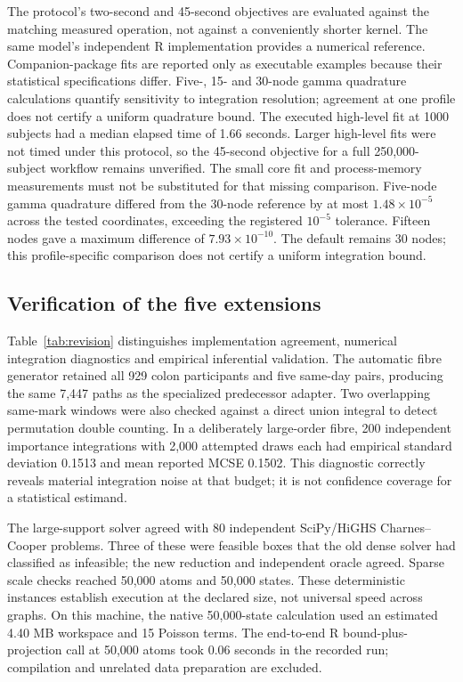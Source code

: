 \documentclass[article,nojss]{jss}
\begin{document}
The protocol's two-second and 45-second objectives are evaluated against the matching measured operation, not against a conveniently shorter kernel. The same model's independent R implementation provides a numerical reference. Companion-package fits are reported only as executable examples because their statistical specifications differ. Five-, 15- and 30-node gamma quadrature calculations quantify sensitivity to integration resolution; agreement at one profile does not certify a uniform quadrature bound.
The executed high-level fit at 1000 subjects had a median elapsed time of 1.66 seconds. Larger high-level fits were not timed under this protocol, so the 45-second objective for a full 250,000-subject workflow remains unverified. The small core fit and process-memory measurements must not be substituted for that missing comparison.
Five-node gamma quadrature differed from the 30-node reference by at most $1.48\times10^{-5}$ across the tested coordinates, exceeding the registered $10^{-5}$ tolerance. Fifteen nodes gave a maximum difference of $7.93\times10^{-10}$. The default remains 30 nodes; this profile-specific comparison does not certify a uniform integration bound.



\subsection{Verification of the five extensions}
Table~\ref{tab:revision} distinguishes implementation agreement, numerical integration diagnostics and empirical inferential validation. The automatic fibre generator retained all 929 colon participants and five same-day pairs, producing the same 7,447 paths as the specialized predecessor adapter. Two overlapping same-mark windows were also checked against a direct union integral to detect permutation double counting. In a deliberately large-order fibre, 200 independent importance integrations with 2,000 attempted draws each had empirical standard deviation 0.1513 and mean reported MCSE 0.1502. This diagnostic correctly reveals material integration noise at that budget; it is not confidence coverage for a statistical estimand.

The large-support solver agreed with 80 independent SciPy/HiGHS Charnes--Cooper problems. Three of these were feasible boxes that the old dense solver had classified as infeasible; the new reduction and independent oracle agreed. Sparse scale checks reached 50,000 atoms and 50,000 states. These deterministic instances establish execution at the declared size, not universal speed across graphs. On this machine, the native 50,000-state calculation used an estimated 4.40 MB workspace and 15 Poisson terms. The end-to-end R bound-plus-projection call at 50,000 atoms took 0.06 seconds in the recorded run; compilation and unrelated data preparation are excluded.
\end{document}
